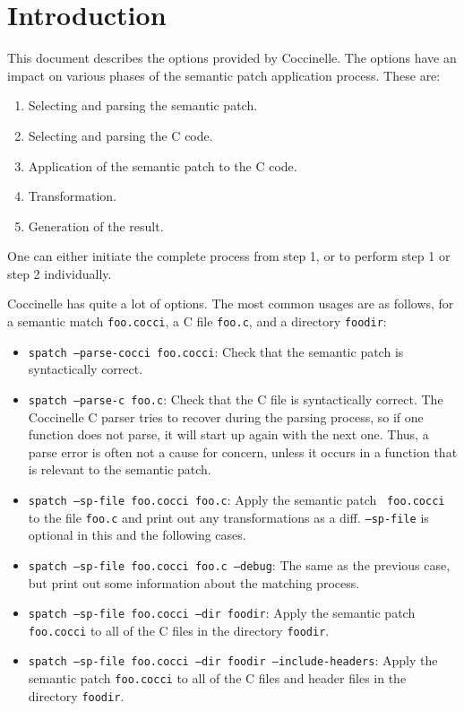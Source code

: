 \section{Introduction}

This document describes the options provided by Coccinelle.  The options
have an impact on various phases of the semantic patch application
process.  These are:

\begin{enumerate}
\item Selecting and parsing the semantic patch.
\item Selecting and parsing the C code.
\item Application of the semantic patch to the C code.
\item Transformation.
\item Generation of the result.
\end{enumerate}

\noindent
One can either initiate the complete process from step 1, or
to perform step 1 or step 2 individually.

Coccinelle has quite a lot of options.  The most common usages are as
follows, for a semantic match {\tt foo.cocci}, a C file {\tt foo.c}, and a
directory {\tt foodir}:

\begin{itemize}
\item {\tt spatch --parse-cocci foo.cocci}: Check that the semantic patch
  is syntactically correct.
\item {\tt spatch --parse-c foo.c}: Check that the C file
  is syntactically correct.  The Coccinelle C parser tries to recover
  during the parsing process, so if one function does not parse, it will
  start up again with the next one.  Thus, a parse error is often not a
  cause for concern, unless it occurs in a function that is relevant to the
  semantic patch.
\item {\tt spatch --sp-file foo.cocci foo.c}: Apply the semantic patch {\tt
    foo.cocci} to the file {\tt foo.c} and print out any transformations as a
  diff.  {\tt --sp-file} is optional in this and the following cases.
\item {\tt spatch --sp-file foo.cocci foo.c --debug}:  The same as the
  previous case, but print out some information about the matching process.
\item {\tt spatch --sp-file foo.cocci --dir foodir}:  Apply the semantic
  patch {\tt foo.cocci} to all of the C files in the directory {\tt foodir}.
\item {\tt spatch --sp-file foo.cocci --dir foodir --include-headers}:  Apply
  the semantic patch {\tt foo.cocci} to all of the C files and header files
  in the directory {\tt foodir}. 
\end{itemize}

